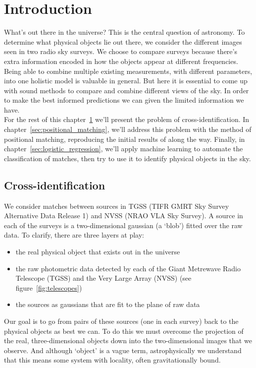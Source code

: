 \documentclass[12pt,a4paper]{article}
\begin{document}
\newpage
\section{Introduction}
\label{sec:introduction}
What's out there in the universe? This is the central question of astronomy. To determine what physical objects lie out there, we consider the different images seen in two radio sky surveys. We choose to compare surveys because there's extra information encoded in how the objects appear at different frequencies. Being able to combine multiple existing measurements, with different parameters, into one holistic model is valuable in general. But here it is essential to come up with sound methods to compare and combine different views of the sky. In order to make the best informed predictions we can given the limited information we have.\\

For the rest of this chapter~\ref{sec:introduction} we'll present the problem of cross-identification. In chapter~\ref{sec:positional_matching}, we'll address this problem with the method of positional matching, reproducing the initial results of \citet{posmatchpaper} along the way. Finally, in chapter~\ref{sec:logistic_regression}, we'll apply machine learning to automate the classification of matches, then try to use it to identify physical objects in the sky.

\subsection{Cross-identification}
We consider matches between sources in TGSS (TIFR GMRT Sky Survey Alternative Data Release 1) and NVSS (NRAO VLA Sky Survey). A source in each of the surveys is a two-dimensional gaussian (a `blob') fitted over the raw data. To clarify, there are three layers at play:
\begin{itemize}
    \item[(1)] the real physical object that exists out in the universe
    \item[(2)] the raw photometric data detected by each of the Giant Metrewave Radio Telescope (TGSS) and the Very Large Array (NVSS) (see figure~\ref{fig:telescopes})
    \item[(3)] the sources as gaussians that are fit to the plane of raw data
\end{itemize}
Our goal is to go from pairs of these sources (one in each survey) back to the physical objects as best we can. To do this we must overcome the projection of the real, three-dimensional objects down into the two-dimensional images that we observe. And although `object' is a vague term, astrophysically we understand that this means some system with locality, often gravitationally bound.\\
\end{document}
